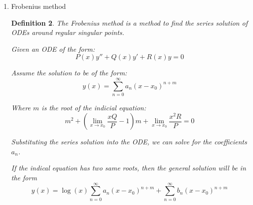 \documentclass{article}
\newtheorem{definition}{Definition}[section]
\begin{document}
\begin{enumerate}
\begin{definition}
              If the quadraric eqation:
              \begin{equation}
                  m^2 + (a-1) m + b = 0
              \end{equation}
              has two distinct roots $m_1$ and $m_2$,
              then the general solution of the Euler equation is:
              \begin{equation}
                  y(x) = c_1 x^{m_1} + c_2 x^{m_2}
              \end{equation}

              If the quadratic equation has a single root $m$,
              then the general solution of the Euler equation is:
              \begin{equation}
                  y(x) = c_1 x^m + c_2 x^m \ln x
              \end{equation}
          \end{definition}
    \item Frobenius method
          \begin{definition}
              The Frobenius method is a method to find the series solution of ODEs around regular singular points.

              Given an ODE of the form:
              \begin{equation}
                  P(x) y'' + Q(x) y' + R(x) y = 0
              \end{equation}

              Assume the solution to be of the form:
              \begin{equation}
                  y(x) = \sum_{n=0}^{\infty} a_n (x - x_0)^{n+m}
              \end{equation}

              Where $m$ is the root of the indicial equation:
              \begin{equation}
                  m^2 + (\lim_{x\rightarrow x_0}\frac{xQ}{P}-1) m
                  + \lim_{x\rightarrow x_0}\frac{x^2R}{P} = 0
              \end{equation}

              Substituting the series solution into the ODE,
              we can solve for the coefficients $a_n$.

              If the indical equation has two same roots,
              then the general solution will be in the form
              \begin{equation}
                  y(x) = \log(x) \sum_{n=0}^{\infty} a_n (x - x_0)^{n+m}
                  + \sum_{n=0}^{\infty} b_n (x - x_0)^{n+m}
              \end{equation}


\end{definition}
\end{enumerate}
\end{document}
